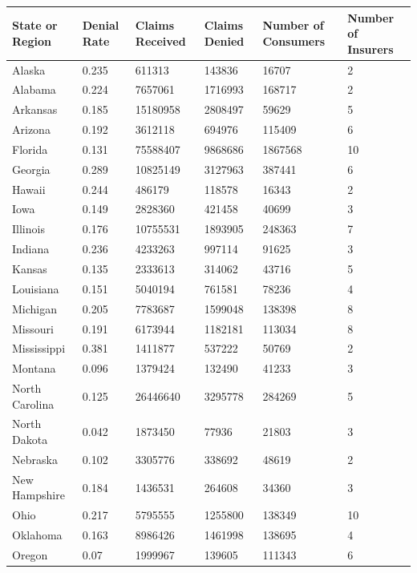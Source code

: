 \documentclass[psamsfonts]{amsart}
\theoremstyle{plain}
\theoremstyle{definition}
\theoremstyle{remark}
\begin{document}
\begin{table}[!ht]
	\centering
	\begin{tabular}{|p{3cm}|p{2cm}|p{2cm}|p{2cm}|p{3cm}|p{2cm}|}
		\hline
		State or Region & Denial Rate & Claims Received & Claims Denied & Number of Consumers & Number of Insurers \\ \hline
		Alaska & 0.235 & 611313 & 143836 & 16707 & 2 \\ \hline
		Alabama & 0.224 & 7657061 & 1716993 & 168717 & 2 \\ \hline
		Arkansas & 0.185 & 15180958 & 2808497 & 59629 & 5 \\ \hline
		Arizona & 0.192 & 3612118 & 694976 & 115409 & 6 \\ \hline
		Florida & 0.131 & 75588407 & 9868686 & 1867568 & 10 \\ \hline
		Georgia & 0.289 & 10825149 & 3127963 & 387441 & 6 \\ \hline
		Hawaii & 0.244 & 486179 & 118578 & 16343 & 2 \\ \hline
		Iowa & 0.149 & 2828360 & 421458 & 40699 & 3 \\ \hline
		Illinois & 0.176 & 10755531 & 1893905 & 248363 & 7 \\ \hline
		Indiana & 0.236 & 4233263 & 997114 & 91625 & 3 \\ \hline
		Kansas & 0.135 & 2333613 & 314062 & 43716 & 5 \\ \hline
		Louisiana & 0.151 & 5040194 & 761581 & 78236 & 4 \\ \hline
		Michigan & 0.205 & 7783687 & 1599048 & 138398 & 8 \\ \hline
		Missouri & 0.191 & 6173944 & 1182181 & 113034 & 8 \\ \hline
		Mississippi & 0.381 & 1411877 & 537222 & 50769 & 2 \\ \hline
		Montana & 0.096 & 1379424 & 132490 & 41233 & 3 \\ \hline
		North Carolina & 0.125 & 26446640 & 3295778 & 284269 & 5 \\ \hline
		North Dakota & 0.042 & 1873450 & 77936 & 21803 & 3 \\ \hline
		Nebraska & 0.102 & 3305776 & 338692 & 48619 & 2 \\ \hline
		New Hampshire & 0.184 & 1436531 & 264608 & 34360 & 3 \\ \hline
		Ohio & 0.217 & 5795555 & 1255800 & 138349 & 10 \\ \hline
		Oklahoma & 0.163 & 8986426 & 1461998 & 138695 & 4 \\ \hline
		Oregon & 0.07 & 1999967 & 139605 & 111343 & 6 \\ \hline

\end{tabular}
\end{table}
\end{document}
